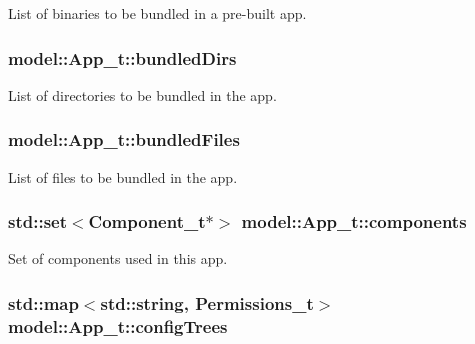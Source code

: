 List of binaries to be bundled in a pre-\/built app. 

\subsubsection[{\texorpdfstring{bundled\+Dirs}{bundledDirs}}]{ model\+::\+App\+\_\+t\+::bundled\+Dirs}\hypertarget{structmodel_1_1_app__t_a15812e8115a498b6c73dce2d1e17fb4a}{}\label{structmodel_1_1_app__t_a15812e8115a498b6c73dce2d1e17fb4a}


List of directories to be bundled in the app. 

\subsubsection[{\texorpdfstring{bundled\+Files}{bundledFiles}}]{ model\+::\+App\+\_\+t\+::bundled\+Files}\hypertarget{structmodel_1_1_app__t_a5501ad73d2b50f6635d5a46d3bc274a6}{}\label{structmodel_1_1_app__t_a5501ad73d2b50f6635d5a46d3bc274a6}


List of files to be bundled in the app. 

\subsubsection[{\texorpdfstring{components}{components}}]{\setlength{\rightskip}{0pt plus 5cm}std\+::set$<${\bf Component\+\_\+t}$\ast$$>$ model\+::\+App\+\_\+t\+::components}\hypertarget{structmodel_1_1_app__t_ae221ab66d750cdc9723c84c976636480}{}\label{structmodel_1_1_app__t_ae221ab66d750cdc9723c84c976636480}


Set of components used in this app. 

\subsubsection[{\texorpdfstring{config\+Trees}{configTrees}}]{\setlength{\rightskip}{0pt plus 5cm}std\+::map$<$std\+::string, {\bf Permissions\+\_\+t}$>$ model\+::\+App\+\_\+t\+::config\+Trees}\hypertarget{structmodel_1_1_app__t_a8465070467987d12cc3bdca51790503e}{}\label{structmodel_1_1_app__t_a8465070467987d12cc3bdca51790503e}


